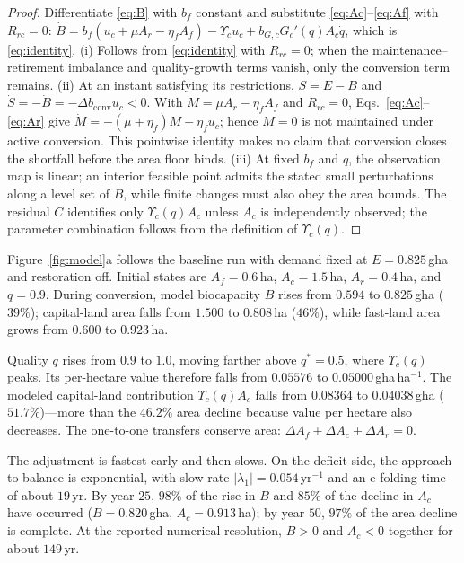\documentclass[preprint,12pt,authoryear]{elsarticle}
\newcommand{\dconv}{\Delta b_{\mathrm{conv}}}
\newcommand{\Ups}{\Upsilon_c}
\begin{document}
\begin{proof}
Differentiate \eqref{eq:B} with $b_f$ constant and substitute \eqref{eq:Ac}--\eqref{eq:Af} with $R_{rc}=0$: $\dot B=b_f(u_c+\mu A_r-\eta_fA_f)-\Ups u_c+b_{G,c}G_c'(q)A_c\dot q$, which is \eqref{eq:identity}. (i) Follows from \eqref{eq:identity} with $R_{rc}=0$; when the maintenance--retirement imbalance and quality-growth terms vanish, only the conversion term remains. (ii) At an instant satisfying its restrictions, $S=E-B$ and $\dot S=-\dot B=-\dconv u_c<0$. With $M=\mu A_r-\eta_fA_f$ and $R_{rc}=0$, Eqs.~\eqref{eq:Ac}--\eqref{eq:Ar} give $\dot M=-(\mu+\eta_f)M-\eta_fu_c$; hence $M=0$ is not maintained under active conversion. This pointwise identity makes no claim that conversion closes the shortfall before the area floor binds. (iii) At fixed $b_f$ and $q$, the observation map is linear; an interior feasible point admits the stated small perturbations along a level set of $B$, while finite changes must also obey the area bounds. The residual $C$ identifies only $\Ups(q)A_c$ unless $A_c$ is independently observed; the parameter combination follows from the definition of $\Ups(q)$.
\end{proof}

Figure~\ref{fig:model}a follows the baseline run with demand fixed at $E=0.825$\,gha and restoration off. Initial states are $A_f=0.6$\,ha, $A_c=1.5$\,ha, $A_r=0.4$\,ha, and $q=0.9$. During conversion, model biocapacity $B$ rises from $0.594$ to $0.825$\,gha ($39\%$); capital-land area falls from $1.500$ to $0.808$\,ha ($46\%$), while fast-land area grows from $0.600$ to $0.923$\,ha.

Quality $q$ rises from $0.9$ to $1.0$, moving farther above $q^*=0.5$, where $\Ups(q)$ peaks. Its per-hectare value therefore falls from $0.05576$ to $0.05000$\,gha\,ha$^{-1}$. The modeled capital-land contribution $\Ups(q)A_c$ falls from $0.08364$ to $0.04038$\,gha ($51.7\%$)—more than the $46.2\%$ area decline because value per hectare also decreases. The one-to-one transfers conserve area: $\Delta A_f+\Delta A_c+\Delta A_r=0$.

The adjustment is fastest early and then slows. On the deficit side, the approach to balance is exponential, with slow rate $|\lambda_1|=0.054$\,yr$^{-1}$ and an e-folding time of about $19$\,yr. By year $25$, $98\%$ of the rise in $B$ and $85\%$ of the decline in $A_c$ have occurred ($B=0.820$\,gha, $A_c=0.913$\,ha); by year $50$, $97\%$ of the area decline is complete. At the reported numerical resolution, $\dot B>0$ and $\dot A_c<0$ together for about $149$\,yr.
\end{document}
